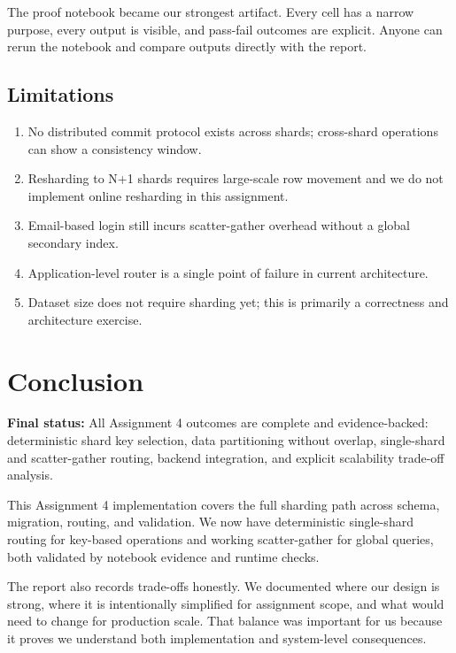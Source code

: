 \documentclass[a4paper,12pt]{article}
\begin{document}
The proof notebook became our strongest artifact. Every cell has a narrow purpose, every output is visible, and pass-fail outcomes are explicit. Anyone can rerun the notebook and compare outputs directly with the report.

\subsection{Limitations}

\begin{enumerate}[leftmargin=*]
\item No distributed commit protocol exists across shards; cross-shard operations can show a consistency window.
\item Resharding to N+1 shards requires large-scale row movement and we do not implement online resharding in this assignment.
\item Email-based login still incurs scatter-gather overhead without a global secondary index.
\item Application-level router is a single point of failure in current architecture.
\item Dataset size does not require sharding yet; this is primarily a correctness and architecture exercise.
\end{enumerate}

\newpage
\section{Conclusion}
\label{sec:conclusion}

\begin{tcolorbox}[successbox]
\textbf{Final status:} All Assignment 4 outcomes are complete and evidence-backed: deterministic shard key selection, data partitioning without overlap, single-shard and scatter-gather routing, backend integration, and explicit scalability trade-off analysis.
\end{tcolorbox}

This Assignment 4 implementation covers the full sharding path across schema, migration, routing, and validation. We now have deterministic single-shard routing for key-based operations and working scatter-gather for global queries, both validated by notebook evidence and runtime checks.

The report also records trade-offs honestly. We documented where our design is strong, where it is intentionally simplified for assignment scope, and what would need to change for production scale. That balance was important for us because it proves we understand both implementation and system-level consequences.
\end{document}

